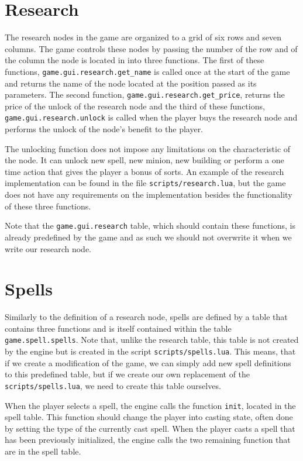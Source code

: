 \section{Research}

The research nodes in the game are organized to a grid of six rows and seven columns. The game controls these nodes by passing the number
of the row and of the column the node is located in into three functions. The first of these functions, \texttt{game.gui.research.get\_name}
is called once at the start of the game and returns the name of the node located at the position passed as its parameters. The second
function, \texttt{game.gui.research.get\_price}, returns the price of the unlock of the research node and the third of these functions,
\texttt{game.gui.research.unlock} is called when the player buys the research node and performs the unlock of the node's benefit to the
player.

The unlocking function does not impose any limitations on the characteristic of the node. It can unlock new spell, new minion, new building
or perform a one time action that gives the player a bonus of sorts. An example of the research implementation can be found in the
file \texttt{scripts/research.lua}, but the game does not have any requirements on the implementation besides the functionality of these
three functions.

Note that the \texttt{game.gui.research} table, which should contain these functions, is already predefined by the game and as such we should
not overwrite it when we write our research node.

\section{Spells}

Similarly to the definition of a research node, spells are defined by a table that contains three functions and is itself contained within
the table \texttt{game.spell.spells}. Note that, unlike the research table, this table is not created by the engine but is created in the
script \texttt{scripts/spells.lua}. This means, that if we create a modification of the game, we can simply add new spell definitions
to this predefined table, but if we create our own replacement of the \texttt{scripts/spells.lua}, we need to create this table ourselves.

When the player selects a spell, the engine calls the function \texttt{init}, located in the spell table. This function should change the
player into casting state, often done by setting the type of the currently cast spell. When the player casts a spell that has been
previously initialized, the engine calls the two remaining function that are in the spell table.

